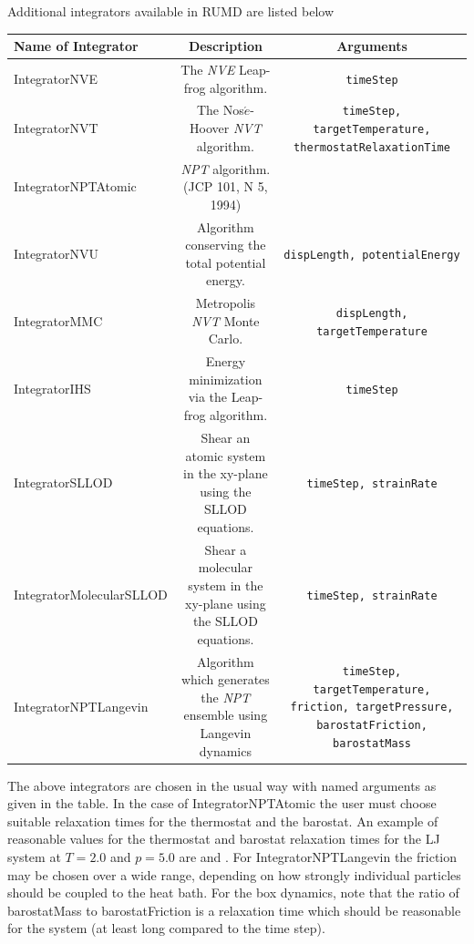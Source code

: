 \newlength{\parwidth}
\setlength{\parwidth}{6 cm}


Additional integrators available in RUMD are listed below
\newline \newline
\begin{tabular}{ | l | c | c |}
  \hline  
  \hline
  Name of Integrator & \textbf{Description} & Arguments \\
  \hline
  IntegratorNVE & \parbox{\parwidth}{The \textit{NVE} Leap-frog algorithm.} & \verb=timeStep= \\
  IntegratorNVT & \parbox{\parwidth}{The Nos$\acute{e}$-Hoover \textit{NVT} algorithm.} & \verb=timeStep, targetTemperature, thermostatRelaxationTime= \\
  IntegratorNPTAtomic & \parbox{\parwidth}{\textit{NPT} algorithm. (JCP 101, N 5, 1994)} & \parbox{\parwidth}{ \centering {} } \\
  IntegratorNVU & \parbox{\parwidth}{Algorithm conserving the total potential energy.} & \verb=dispLength, potentialEnergy= \\
  IntegratorMMC & \parbox{\parwidth}{Metropolis \textit{NVT} Monte Carlo.} & \verb=dispLength, targetTemperature= \\
  IntegratorIHS &\parbox{\parwidth}{ Energy minimization via the Leap-frog algorithm.} & \verb=timeStep= \\
  IntegratorSLLOD & \parbox{\parwidth}{Shear an atomic system in the xy-plane using the SLLOD equations.} & \verb=timeStep, strainRate= \\
  IntegratorMolecularSLLOD & \parbox{\parwidth}{Shear a molecular system in the xy-plane using the SLLOD equations.} & \verb=timeStep, strainRate= \\ 
IntegratorNPTLangevin & \parbox{\parwidth}{Algorithm which generates the \textit{NPT} ensemble using Langevin dynamics} & \verb=timeStep, targetTemperature, friction, targetPressure, barostatFriction, barostatMass= \\
  \hline
  \hline
\end{tabular}
\newline \newline
The above integrators are chosen in the usual way with named arguments as given in the table.
In the case of IntegratorNPTAtomic the user must choose suitable relaxation times for the thermostat and the barostat.
An example of reasonable values for the thermostat and barostat relaxation times for the LJ system at $T=2.0$ and $p=5.0$ are 
 and . For IntegratorNPTLangevin the friction may be chosen over a wide range, depending on how strongly individual particles should be coupled to the heat bath. For the box dynamics, note that the ratio of barostatMass to barostatFriction is a relaxation time which should be reasonable for the system (at least long compared to the time step).


